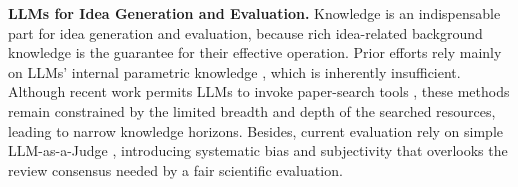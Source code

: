 \textbf{LLMs for Idea Generation and Evaluation.}
Knowledge is an indispensable part for idea generation and evaluation, because rich idea-related background knowledge is the guarantee for their effective operation.
Prior efforts rely mainly on LLMs' internal parametric knowledge \cite{ai-scientist,aide,alphaevolve,alpharesearch,ai-scientist-v2}, which is inherently insufficient.
Although recent work permits LLMs to invoke paper-search tools \cite{researchagent,virsci,rnd,scipip,can-llm-gen-novel,chain-of-ideas,deep-ideation,wispaper,ai-researcher,internagent,opennovelty}, these methods remain constrained by the limited breadth and depth of the searched resources, leading to narrow knowledge horizons.
Besides, current evaluation rely on simple LLM-as-a-Judge \cite{ai-researcher,internagent,can-llm-gen-novel,idea-novel-checker,scholareval}, introducing systematic bias and subjectivity that overlooks the review consensus needed by a fair scientific evaluation.
